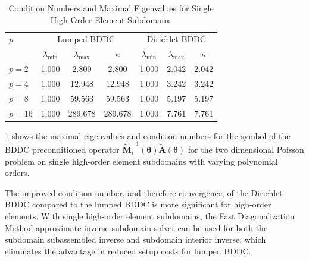 \documentclass[review]{siamart190516}
\begin{document}
\begin{table}[ht!]
\begin{center}
\begin{tabular}{l ccc ccc}
  \toprule
  $p$  &  \multicolumn{3}{c}{Lumped BDDC}  &  \multicolumn{3}{c}{Dirichlet BDDC}  \\
                      &  $\lambda_{\text{min}}$  &  $\lambda_{\text{max}}$  &  $\kappa$ & $\lambda_{\text{min}}$  &  $\lambda_{\text{max}}$ & $\kappa$  \\
  \toprule
  $p = 2$   &  1.000  &    2.800  &    2.800  &  1.000  &  2.042  &  2.042  \\
  $p = 4$   &  1.000  &   12.948  &   12.948  &  1.000  &  3.242  &  3.242  \\
  $p = 8$   &  1.000  &   59.563  &   59.563  &  1.000  &  5.197  &  5.197  \\
  $p = 16$  &  1.000  &  289.678  &  289.678  &  1.000  &  7.761  &  7.761  \\
  \bottomrule
\end{tabular}
\end{center}
\caption{Condition Numbers and Maximal Eigenvalues for Single High-Order Element Subdomains}
\label{table:high_order_element_bddc}
\end{table}

\cref{table:high_order_element_bddc} shows the maximal eigenvalues and condition numbers for the symbol of the BDDC preconditioned operator $\tilde{\mathbf{M}}^{-1}_i \left( \boldsymbol{\theta} \right) \tilde{\mathbf{A}} \left( \boldsymbol{\theta} \right)$ for the two dimensional Poisson problem on single high-order element subdomains with varying polynomial orders.

The improved condition number, and therefore convergence, of the Dirichlet BDDC compared to the lumped BDDC is more significant for high-order elements.
With single high-order element subdomains, the Fast Diagonalization Method approximate inverse subdomain solver can be used for both the subdomain subassembled inverse and subdomain interior inverse, which eliminates the advantage in reduced setup costs for lumped BDDC.
\end{document}
